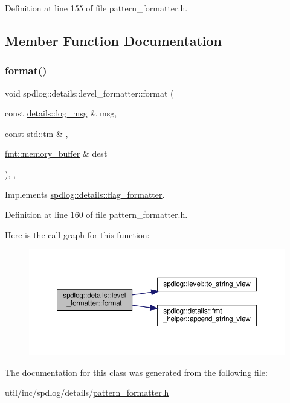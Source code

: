 Definition at line 155 of file pattern\+\_\+formatter.\+h.



\subsection{Member Function Documentation}
\mbox{\label{classspdlog_1_1details_1_1level__formatter_a36967967164ade9221ad216e0b617749}} 
\subsubsection{\texorpdfstring{format()}{format()}}
{\footnotesize\ttfamily void spdlog\+::details\+::level\+\_\+formatter\+::format (\begin{DoxyParamCaption}\item[{const \hyperlink{structspdlog_1_1details_1_1log__msg}{details\+::log\+\_\+msg} \&}]{msg,  }\item[{const std\+::tm \&}]{,  }\item[{\hyperlink{format_8h_a21cbf729f69302f578e6db21c5e9e0d2}{fmt\+::memory\+\_\+buffer} \&}]{dest }\end{DoxyParamCaption})\hspace{0.3cm}{\ttfamily [inline]}, {\ttfamily [override]}, {\ttfamily [virtual]}}



Implements \hyperlink{classspdlog_1_1details_1_1flag__formatter_a33fb3e42a4c8200cceb833d92b53fb67}{spdlog\+::details\+::flag\+\_\+formatter}.



Definition at line 160 of file pattern\+\_\+formatter.\+h.

Here is the call graph for this function\+:
\nopagebreak
\begin{figure}[H]
\begin{center}
\leavevmode
\includegraphics[width=350pt]{classspdlog_1_1details_1_1level__formatter_a36967967164ade9221ad216e0b617749_cgraph}
\end{center}
\end{figure}


The documentation for this class was generated from the following file\+:\begin{DoxyCompactItemize}
\item 
util/inc/spdlog/details/\hyperlink{pattern__formatter_8h}{pattern\+\_\+formatter.\+h}\end{DoxyCompactItemize}
